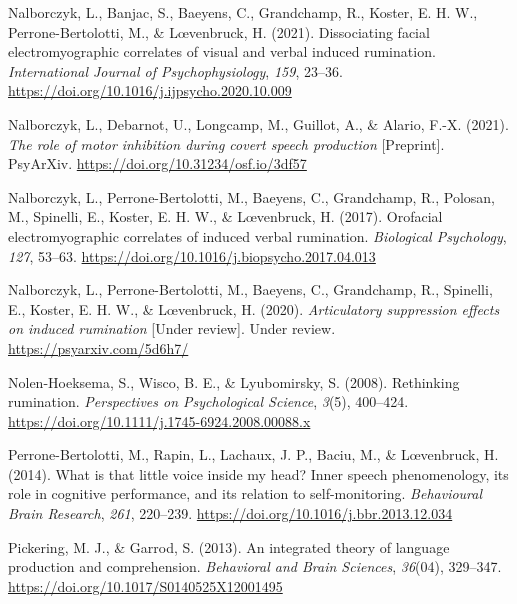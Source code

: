 \documentclass[
  english,
  man, donotrepeattitle,mask,floatsintext]{apa6}
\newlength{\cslhangindent}
\newlength{\cslentryspacingunit} %
\newenvironment{CSLReferences}[2] %
 {%
  \setlength{\parindent}{0pt}
  \ifodd #1
  \let\oldpar\par
  \def\par{\hangindent=\cslhangindent\oldpar}
  \fi
  \setlength{\parskip}{#2\cslentryspacingunit}
 }%
 {}
\begin{document}
\begin{CSLReferences}{1}{0}
\leavevmode{}%
Nalborczyk, L., Banjac, S., Baeyens, C., Grandchamp, R., Koster, E. H. W., Perrone-Bertolotti, M., \& Lœvenbruck, H. (2021). Dissociating facial electromyographic correlates of visual and verbal induced rumination. \emph{International Journal of Psychophysiology}, \emph{159}, 23--36. \url{https://doi.org/10.1016/j.ijpsycho.2020.10.009}

\leavevmode{}%
Nalborczyk, L., Debarnot, U., Longcamp, M., Guillot, A., \& Alario, F.-X. (2021). \emph{The role of motor inhibition during covert speech production} {[}Preprint{]}. {PsyArXiv}. \url{https://doi.org/10.31234/osf.io/3df57}

\leavevmode{}%
Nalborczyk, L., Perrone-Bertolotti, M., Baeyens, C., Grandchamp, R., Polosan, M., Spinelli, E., Koster, E. H. W., \& Lœvenbruck, H. (2017). Orofacial electromyographic correlates of induced verbal rumination. \emph{Biological Psychology}, \emph{127}, 53--63. \url{https://doi.org/10.1016/j.biopsycho.2017.04.013}

\leavevmode{}%
Nalborczyk, L., Perrone-Bertolotti, M., Baeyens, C., Grandchamp, R., Spinelli, E., Koster, E. H. W., \& Lœvenbruck, H. (2020). \emph{Articulatory suppression effects on induced rumination} {[}Under review{]}. Under review. \url{https://psyarxiv.com/5d6h7/}

\leavevmode{}%
Nolen-Hoeksema, S., Wisco, B. E., \& Lyubomirsky, S. (2008). Rethinking rumination. \emph{Perspectives on Psychological Science}, \emph{3}(5), 400--424. \url{https://doi.org/10.1111/j.1745-6924.2008.00088.x}

\leavevmode{}%
Perrone-Bertolotti, M., Rapin, L., Lachaux, J. P., Baciu, M., \& Lœvenbruck, H. (2014). What is that little voice inside my head? Inner speech phenomenology, its role in cognitive performance, and its relation to self-monitoring. \emph{Behavioural Brain Research}, \emph{261}, 220--239. \url{https://doi.org/10.1016/j.bbr.2013.12.034}

\leavevmode{}%
Pickering, M. J., \& Garrod, S. (2013). An integrated theory of language production and comprehension. \emph{Behavioral and Brain Sciences}, \emph{36}(04), 329--347. \url{https://doi.org/10.1017/S0140525X12001495}


\end{CSLReferences}
\end{document}
